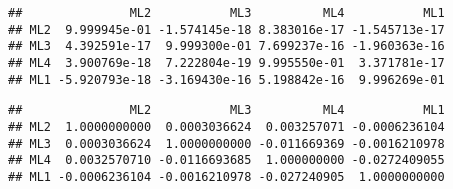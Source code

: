 \documentclass[
]{article}
\newenvironment{Shaded}{\begin{snugshade}}{\end{snugshade}}
\newcommand{\KeywordTok}[1]{\textcolor[rgb]{0.13,0.29,0.53}{\textbf{#1}}}
\newcommand{\NormalTok}[1]{#1}
\newcommand{\OperatorTok}[1]{\textcolor[rgb]{0.81,0.36,0.00}{\textbf{#1}}}
\begin{document}
\begin{verbatim}
##               ML2           ML3          ML4           ML1
## ML2  9.999945e-01 -1.574145e-18 8.383016e-17 -1.545713e-17
## ML3  4.392591e-17  9.999300e-01 7.699237e-16 -1.960363e-16
## ML4  3.900769e-18  7.222804e-19 9.995550e-01  3.371781e-17
## ML1 -5.920793e-18 -3.169430e-16 5.198842e-16  9.996269e-01
\end{verbatim}

\begin{Shaded}
\end{Shaded}

\begin{verbatim}
##               ML2           ML3          ML4           ML1
## ML2  1.0000000000  0.0003036624  0.003257071 -0.0006236104
## ML3  0.0003036624  1.0000000000 -0.011669369 -0.0016210978
## ML4  0.0032570710 -0.0116693685  1.000000000 -0.0272409055
## ML1 -0.0006236104 -0.0016210978 -0.027240905  1.0000000000
\end{verbatim}
\end{document}
